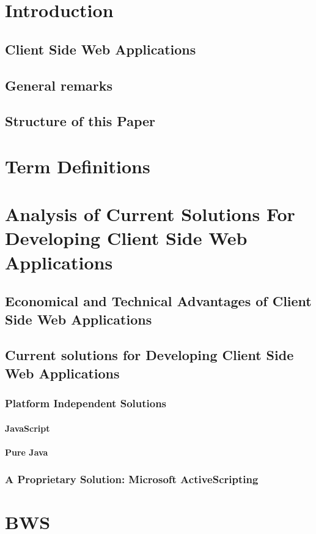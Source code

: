 \section{Introduction}
 
 
 \subsection{Client Side Web Applications}
 \subsection{General remarks}
 \subsection{Structure of this Paper}
\section{Term Definitions}
\section{Analysis of Current Solutions For Developing Client Side Web Applications}
 \subsection{Economical and Technical Advantages of Client Side Web Applications}
 \subsection{Current solutions for Developing Client Side Web Applications}
  \subsubsection{Platform Independent Solutions}
   \paragraph{JavaScript}
   
   \paragraph{Pure Java}
  \subsubsection{A Proprietary Solution: Microsoft ActiveScripting}
\section{BWS}
